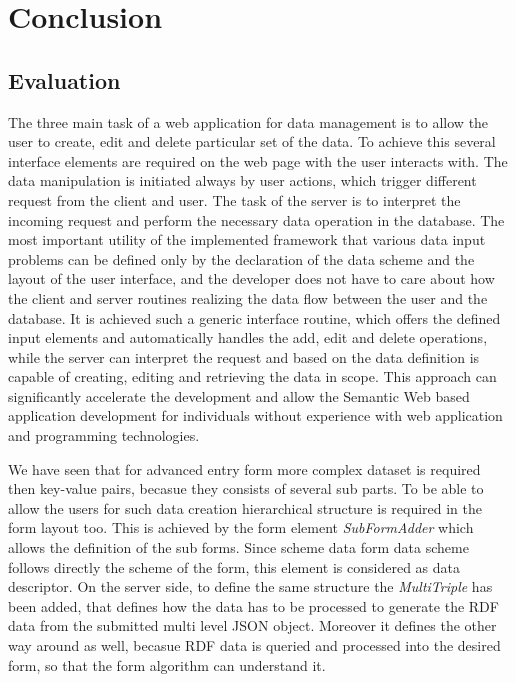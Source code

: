 

\chapter{Conclusion}

\section{Evaluation}

The three main task of a web application for data management is to allow the user to create, edit and delete particular set of the data. To achieve this several interface elements are required on the web page with the user interacts with. The data manipulation is initiated always by user actions, which trigger different request from the client and user. The task of the server is to interpret the incoming request and perform the necessary data operation in the database. The most important utility of the implemented framework that various data input problems can be defined only by the declaration of the data scheme and the layout of the user interface, and the developer does not have to care about how the client and server routines realizing the data flow between the user and the database. It is achieved such a generic interface routine, which offers the defined input elements and automatically handles the add, edit and delete operations, while the server can interpret the request and based on the data definition is capable of creating, editing and retrieving the data in scope. This approach can significantly accelerate the development and allow the Semantic Web based application development for individuals without experience with web application and programming technologies.





We have seen that for advanced entry form more complex dataset is required then key-value pairs, becasue they consists of several sub parts. To be able to allow the users for such data creation hierarchical structure is required in the form layout too. This is achieved by the form element \textit{SubFormAdder} which allows the definition of the sub forms. Since scheme data form data scheme follows directly the scheme of the form, this element is considered as data descriptor. On the server side, to define the same structure the \textit{MultiTriple} has been added, that defines how the data has to be processed to generate the RDF data from the submitted multi level JSON object. Moreover it defines the other way around as well, becasue RDF data is queried and processed into the desired form, so that the form algorithm can understand it. 




